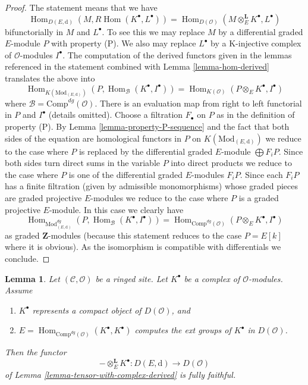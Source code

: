 \documentclass{stacks-project}
\theoremstyle{plain}
\newtheorem{lemma}[subsection]{Lemma}
\theoremstyle{definition}
\theoremstyle{remark}
\numberwithin{equation}{subsection}
\def\Hom{\mathop{\mathrm{Hom}}\nolimits}
\begin{document}
\begin{proof}
The statement means that we have
$$
\Hom_{D(E, \text{d})}(M, R\Hom(K^\bullet, L^\bullet)) =
\Hom_{D(\mathcal{O})}(M \otimes^\mathbf{L}_E K^\bullet, L^\bullet)
$$
bifunctorially in $M$ and $L^\bullet$. To see this we may replace $M$
by a differential graded $E$-module $P$ with property (P).
We also may replace $L^\bullet$ by a K-injective complex of
$\mathcal{O}$-modules $I^\bullet$. The computation
of the derived functors given in the lemmas referenced in the statement
combined with Lemma \ref{lemma-hom-derived} translates the above into
$$
\Hom_{K(\text{Mod}_{(E, \text{d})})}
(P, \Hom_\mathcal{B}(K^\bullet, I^\bullet)) =
\Hom_{K(\mathcal{O})}(P \otimes_E K^\bullet, I^\bullet)
$$
where $\mathcal{B} = \text{Comp}^{dg}(\mathcal{O})$. 
There is an evaluation map from right to left functorial
in $P$ and $I^\bullet$ (details omitted).
Choose a filtration $F_\bullet$ on $P$ as in the definition of property (P).
By Lemma \ref{lemma-property-P-sequence} and the fact that
both sides of the equation are homological functors in $P$
on $K(\text{Mod}_{(E, \text{d})})$
we reduce to the case where $P$ is replaced by
the differential graded $E$-module $\bigoplus F_iP$.
Since both sides turn direct sums in the variable $P$
into direct products we reduce to the case where $P$ is one of the
differential graded $E$-modules $F_iP$.
Since each $F_iP$ has a finite filtration (given by admissible
monomorphisms) whose graded pieces are graded projective $E$-modules
we reduce to the case where $P$ is a graded projective $E$-module.
In this case we clearly have
$$
\Hom_{\text{Mod}^{dg}_{(E, \text{d})}}
(P, \Hom_\mathcal{B}(K^\bullet, I^\bullet)) =
\Hom_{\text{Comp}^{dg}(\mathcal{O})}(P \otimes_E K^\bullet, I^\bullet)
$$
as graded $\mathbf{Z}$-modules (because this statement reduces to the case
$P = E[k]$ where it is obvious). As the isomorphism is compatible with
differentials we conclude.
\end{proof}

\begin{lemma}
\label{lemma-fully-faithful-in-compact-case}
Let $(\mathcal{C}, \mathcal{O})$ be a ringed site.
Let $K^\bullet$ be a complex of $\mathcal{O}$-modules.
Assume
\begin{enumerate}
\item $K^\bullet$ represents a compact object of $D(\mathcal{O})$, and
\item $E = \Hom_{\text{Comp}^{dg}(\mathcal{O})}(K^\bullet, K^\bullet)$
computes the ext groups of $K^\bullet$ in $D(\mathcal{O})$.
\end{enumerate}
Then the functor
$$
- \otimes_E^\mathbf{L} K^\bullet :
D(E, \text{d})
\longrightarrow
D(\mathcal{O})
$$
of Lemma \ref{lemma-tensor-with-complex-derived} is fully faithful.
\end{lemma}
\end{document}
